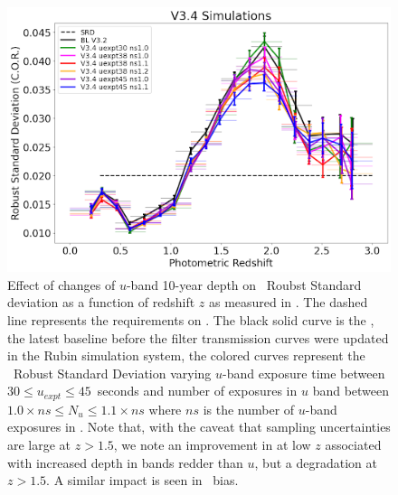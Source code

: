 \begin{figure}
\centering
\includegraphics[height=0.30\textwidth]{figures/photo-z.png}

\caption{Effect of changes of $u$-band 10-year depth on \pz\ Roubst Standard deviation as a function of redshift $z$ as measured in \cite{Graham_2017}. The dashed line represents the  requirements on \pz. The black solid curve is the , the latest baseline before the filter transmission curves were updated in the Rubin simulation system, the colored curves represent the \pz\ Robust Standard Deviation varying $u$-band exposure time between $30\leq u_{expt} \leq45$~seconds and number of exposures in $u$ band between $1.0\times ns \leq N_u \leq 1.1\times ns$ where $ns$ is the number of $u$-band exposures in . Note that, with the caveat that sampling uncertainties are large at $z>1.5$, we note an improvement in \pz at low $z$ associated with increased depth in bands redder than $u$, but a degradation at $z>1.5$. A similar impact is seen in \pz\ bias.}

\end{figure}
